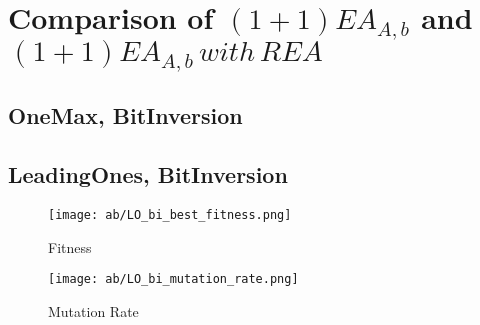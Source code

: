 \documentclass{article}
\begin{document}
\section{Comparison of $(1+1)EA_{A,b}$ and $(1+1)EA_{A,b}\,with\,REA$}

\subsection{OneMax, BitInversion}

%
%

\subsection{LeadingOnes, BitInversion}

\begin{figure}[H]
  \texttt{[image: ab/LO\_bi\_best\_fitness.png]}
  \caption{Fitness}
\end{figure}
\begin{figure}[H]
  \texttt{[image: ab/LO\_bi\_mutation\_rate.png]}
  \caption{Mutation Rate}
\end{figure}

%
\end{document}
